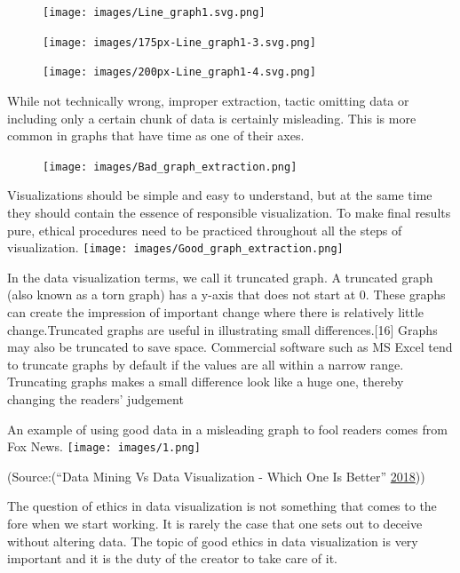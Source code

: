 \documentclass[]{book}
\begin{document}
\begin{figure}
\centering
\texttt{[image: images/Line\_graph1.svg.png]}
\caption{}
\end{figure}

\begin{figure}
\centering
\texttt{[image: images/175px-Line\_graph1-3.svg.png]}
\caption{}
\end{figure}

\begin{figure}
\centering
\texttt{[image: images/200px-Line\_graph1-4.svg.png]}
\caption{}
\end{figure}

While not technically wrong, improper extraction, tactic omitting data
or including only a certain chunk of data is certainly misleading. This
is more common in graphs that have time as one of their axes.

\begin{figure}
\centering
\texttt{[image: images/Bad\_graph\_extraction.png]}
\caption{}
\end{figure}

Visualizations should be simple and easy to understand, but at the same
time they should contain the essence of responsible visualization. To
make final results pure, ethical procedures need to be practiced
throughout all the steps of visualization.
\texttt{[image: images/Good\_graph\_extraction.png]}

In the data visualization terms, we call it truncated graph. A truncated
graph (also known as a torn graph) has a y-axis that does not start at
0. These graphs can create the impression of important change where
there is relatively little change.Truncated graphs are useful in
illustrating small differences.{[}16{]} Graphs may also be truncated to
save space. Commercial software such as MS Excel tend to truncate graphs
by default if the values are all within a narrow range. Truncating
graphs makes a small difference look like a huge one, thereby changing
the readers' judgement

An example of using good data in a misleading graph to fool readers
comes from Fox News. \texttt{[image: images/1.png]}

(Source:(``Data Mining Vs Data Visualization - Which One Is Better''
\protect\hyperlink{ref-datamining_vs_viz}{2018}))

The question of ethics in data visualization is not something that comes
to the fore when we start working. It is rarely the case that one sets
out to deceive without altering data. The topic of good ethics in data
visualization is very important and it is the duty of the creator to
take care of it.
\end{document}
